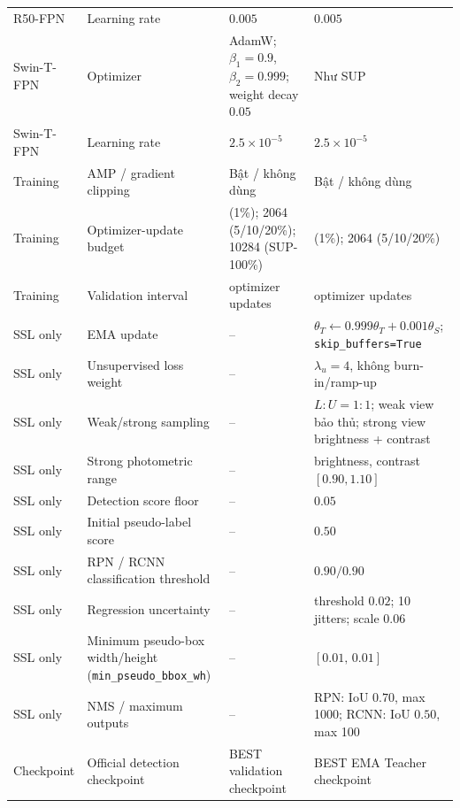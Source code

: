 \documentclass[pdflatex,sn-mathphys-num]{sn-jnl}%
\theoremstyle{thmstyleone}%
\theoremstyle{thmstyletwo}%
\theoremstyle{thmstylethree}%
\begin{document}
\begin{longtable}{
>{\raggedright\arraybackslash}p{}
>{\raggedright\arraybackslash}p{}
>{\raggedright\arraybackslash}p{}
>{\raggedright\arraybackslash}p{}
}
R50-FPN &
Learning rate &
\(0.005\) &
\(0.005\) \\

Swin-T-FPN &
Optimizer &
AdamW; \(\beta_1=0.9\), \(\beta_2=0.999\);
weight decay \(0.05\) &
Như SUP \\

Swin-T-FPN &
Learning rate &
\(2.5\times10^{-5}\) &
\(2.5\times10^{-5}\) \\

Training &
AMP / gradient clipping &
Bật / không dùng &
Bật / không dùng \\

Training &
Optimizer-update budget &
1032 (1\%); 2064 (5/10/20\%);
10284 (SUP-100\%) &
1032 (1\%); 2064 (5/10/20\%) \\

Training &
Validation interval &
172 optimizer updates &
172 optimizer updates \\

SSL only &
EMA update &
-- &
\(\theta_T\leftarrow0.999\theta_T+
0.001\theta_S\);
\texttt{skip\_buffers=True} \\

SSL only &
Unsupervised loss weight &
-- &
\(\lambda_u=4\), không burn-in/ramp-up \\

SSL only &
Weak/strong sampling &
-- &
\(L:U=1:1\);
weak view bảo thủ;
strong view brightness + contrast \\

SSL only &
Strong photometric range &
-- &
brightness, contrast \([0.90, 1.10]\) \\

SSL only &
Detection score floor &
-- &
\(0.05\) \\

SSL only &
Initial pseudo-label score &
-- &
\(0.50\) \\

SSL only &
RPN / RCNN classification threshold &
-- &
\(0.90 / 0.90\) \\

SSL only &
Regression uncertainty &
-- &
threshold \(0.02\);
10 jitters; scale \(0.06\) \\

SSL only &
Minimum pseudo-box width/height
(\texttt{min\_pseudo\_bbox\_wh}) &
-- &
\([0.01,\,0.01]\) \\

SSL only &
NMS / maximum outputs &
-- &
RPN: IoU \(0.70\), max 1000;
RCNN: IoU \(0.50\), max 100 \\

Checkpoint &
Official detection checkpoint &
BEST validation checkpoint &
BEST EMA Teacher checkpoint \\

\end{longtable}
\end{document}
